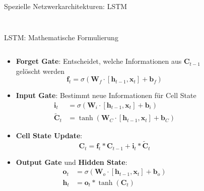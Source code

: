 \documentclass[aspectratio=1610, xcolor=dvipsnames, 9pt]{beamer}
\begin{document}
\begin{frame}{Spezielle Netzwerkarchitekturen: LSTM}
\begin{columns}
\begin{column}{0.4\textwidth}
\begin{figure}
                \end{figure}

           \end{column}
        \end{columns}
      \end{frame}
      
            
      \begin{frame}{LSTM: Mathematische Formulierung}
        \begin{columns}
          \begin{column}{0.6\textwidth}
            \begin{itemize}              
              \item \textbf{Forget Gate}: Entscheidet, welche Informationen aus $\mathbf{C}_{t-1}$ gelöscht werden
              \begin{equation}
                \mathbf{f}_t = \sigma(\mathbf{W}_f \cdot [\mathbf{h}_{t-1}, \mathbf{x}_t] + \mathbf{b}_f)
              \end{equation}
              \item \textbf{Input Gate}: Bestimmt neue Informationen für Cell State
              \begin{align}
                \mathbf{i}_t &= \sigma(\mathbf{W}_i \cdot [\mathbf{h}_{t-1}, \mathbf{x}_t] + \mathbf{b}_i) \\
                \tilde{\mathbf{C}}_t &= \tanh(\mathbf{W}_C \cdot [\mathbf{h}_{t-1}, \mathbf{x}_t] + \mathbf{b}_C)
              \end{align}
              \item \textbf{Cell State Update}:
              \begin{equation}
                \mathbf{C}_t = \mathbf{f}_t * \mathbf{C}_{t-1} + \mathbf{i}_t * \tilde{\mathbf{C}}_t
              \end{equation}
              \item \textbf{Output Gate} und \textbf{Hidden State}:
              \begin{align}
                \mathbf{o}_t &= \sigma(\mathbf{W}_o \cdot [\mathbf{h}_{t-1}, \mathbf{x}_t] + \mathbf{b}_o) \\
                \mathbf{h}_t &= \mathbf{o}_t * \tanh(\mathbf{C}_t)
              \end{align}
            \end{itemize}
          \end{column}
           \begin{column}{0.4\textwidth}
             \begin{figure}

\end{figure}
\end{column}
\end{columns}
\end{frame}
\end{document}
